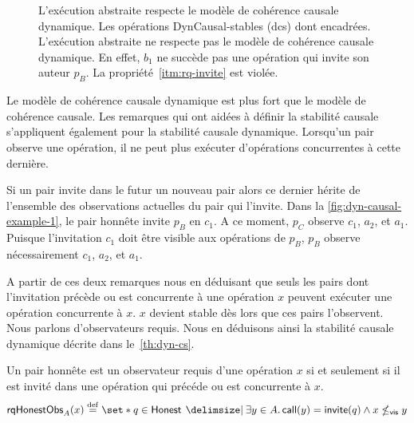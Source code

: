 \begin{figure}[htb]
\begin{subfigure}{\linewidth}
    \caption{}
    \label{fig:dyn-causal-example-2}
\end{subfigure}
\caption[Stabilité causale dynamique]{L'exécution abstraite  respecte le modèle de cohérence causale dynamique.
Les opérations DynCausal-stables (dcs) dont encadrées.
L'exécution abstraite  ne respecte pas le modèle de cohérence causale dynamique.
En effet, $b_1$ ne succède pas une opération qui invite son auteur $p_B$.
La propriété~\ref{itm:rq-invite} est violée.}
\label{fig:dyn-causal-example}
\end{figure}

Le modèle de cohérence causale dynamique est plus fort que le modèle de cohérence causale.
Les remarques qui ont aidées à définir la stabilité causale s'appliquent également pour la stabilité causale dynamique.
Lorsqu'un pair observe une opération, il ne peut plus exécuter d'opérations concurrentes à cette dernière.

Si un pair invite dans le futur un nouveau pair alors ce dernier hérite de l'ensemble des observations actuelles du pair qui l'invite.
Dans la \autoref{fig:dyn-causal-example-1}, le pair honnête invite $p_B$ en $c_1$.
A ce moment, $p_C$ observe $c_1$, $a_2$, et $a_1$.
Puisque l'invitation $c_1$ doit être visible aux opérations de $p_B$, $p_B$ observe nécessairement $c_1$, $a_2$, et $a_1$.


A partir de ces deux remarques nous en déduisant que seuls les pairs dont l'invitation précède ou est concurrente à une opération $x$ peuvent exécuter une opération concurrente à $x$.
$x$ devient stable dès lors que ces pairs l'observent.
Nous parlons d'observateurs requis.
Nous en déduisons ainsi la stabilité causale dynamique décrite dans le~\autoref{th:dyn-cs}.

\begin{definition}
Un pair honnête est un observateur requis d'une opération $x$ si et seulement si il est invité dans une opération qui précéde ou est concurrente à $x$.
\begin{equation*}
    \trm{rqHonestObs}_A(x) \defeq \set*{q \in \trm{Honest} \given \exists y \in A \qsep \trm{call}(y) = \trm{invite}(q) \land x \nviseq y}
\end{equation*}
\end{definition}


